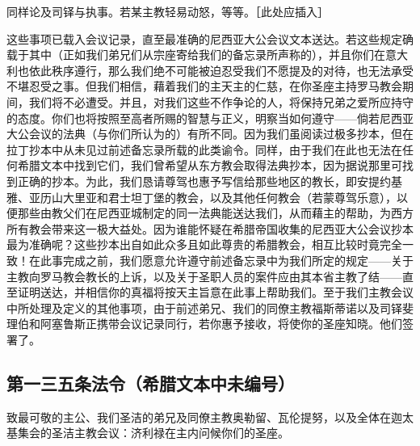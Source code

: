 同样论及司铎与执事。若某主教轻易动怒，等等。［此处应插入］\par

这些事项已载入会议记录，直至最准确的尼西亚大公会议文本送达。若这些规定确载于其中（正如我们弟兄们从宗座寄给我们的备忘录所声称的），并且你们在意大利也依此秩序遵行，那么我们绝不可能被迫忍受我们不愿提及的对待，也无法承受不堪忍受之事。但我们相信，藉着我们的主天主的仁慈，在你圣座主持罗马教会期间，我们将不必遭受。并且，对我们这些不作争论的人，将保持兄弟之爱所应持守的态度。你们也将按照至高者所赐的智慧与正义，明察当如何遵守——倘若尼西亚大公会议的法典（与你们所认为的）有所不同。因为我们虽阅读过极多抄本，但在拉丁抄本中从未见过前述备忘录所载的此类谕令。同样，由于我们在此也无法在任何希腊文本中找到它们，我们曾希望从东方教会取得法典抄本，因为据说那里可找到正确的抄本。为此，我们恳请尊驾也惠予写信给那些地区的教长，即安提约基雅、亚历山大里亚和君士坦丁堡的教会，以及其他任何教会（若蒙尊驾乐意），以便那些由教父们在尼西亚城制定的同一法典能送达我们，从而藉主的帮助，为西方所有教会带来这一极大益处。因为谁能怀疑在希腊帝国收集的尼西亚大公会议抄本最为准确呢？这些抄本出自如此众多且如此尊贵的希腊教会，相互比较时竟完全一致！在此事完成之前，我们愿意允许遵守前述备忘录中为我们所定的规定——关于主教向罗马教会教长的上诉，以及关于圣职人员的案件应由其本省主教了结——直至证明送达，并相信你的真福将按天主旨意在此事上帮助我们。至于我们主教会议中所处理及定义的其他事项，由于前述弟兄、我们的同僚主教福斯蒂诺以及司铎斐理伯和阿塞鲁斯正携带会议记录同行，若你惠予接收，将使你的圣座知晓。他们签署了。\par


\subsection{第一三五条法令（希腊文本中未编号）}

\par

致最可敬的主公、我们圣洁的弟兄及同僚主教奥勒留、瓦伦提努，以及全体在迦太基集会的圣洁主教会议：济利禄在主内问候你们的圣座。\par


